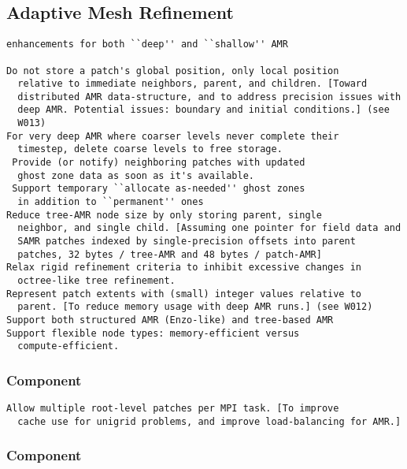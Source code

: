 \documentclass[14pt,letter]{article}
\begin{document}
\subsection{Adaptive Mesh Refinement}

\begin{verbatim}
enhancements for both ``deep'' and ``shallow'' AMR

Do not store a patch's global position, only local position
  relative to immediate neighbors, parent, and children. [Toward
  distributed AMR data-structure, and to address precision issues with
  deep AMR. Potential issues: boundary and initial conditions.] (see
  W013)
For very deep AMR where coarser levels never complete their
  timestep, delete coarse levels to free storage.
 Provide (or notify) neighboring patches with updated
  ghost zone data as soon as it's available.
 Support temporary ``allocate as-needed'' ghost zones
  in addition to ``permanent'' ones
Reduce tree-AMR node size by only storing parent, single
  neighbor, and single child. [Assuming one pointer for field data and
  SAMR patches indexed by single-precision offsets into parent
  patches, 32 bytes / tree-AMR and 48 bytes / patch-AMR]
Relax rigid refinement criteria to inhibit excessive changes in
  octree-like tree refinement.
Represent patch extents with (small) integer values relative to
  parent. [To reduce memory usage with deep AMR runs.] (see W012)
Support both structured AMR (Enzo-like) and tree-based AMR
Support flexible node types: memory-efficient versus
  compute-efficient.
\end{verbatim}

\subsubsection{ Component}

\begin{verbatim}
Allow multiple root-level patches per MPI task. [To improve
  cache use for unigrid problems, and improve load-balancing for AMR.]
\end{verbatim}

\subsubsection{ Component}
\end{document}
